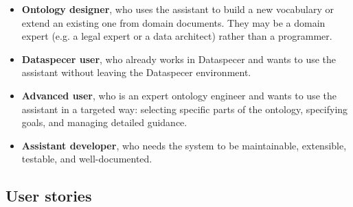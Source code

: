 \documentclass{article}
\begin{document}
\begin{itemize}
  \item \textbf{Ontology designer}, who uses the assistant to build a new vocabulary or extend an existing one from domain documents. They may be a domain expert (e.g. a legal expert or a data architect) rather than a programmer.
  \item \textbf{Dataspecer user}, who already works in Dataspecer and wants to use the assistant without leaving the Dataspecer environment.
  \item \textbf{Advanced user}, who is an expert ontology engineer and wants to use the assistant in a targeted way: selecting specific parts of the ontology, specifying goals, and managing detailed guidance.
  \item \textbf{Assistant developer}, who needs the system to be maintainable, extensible, testable, and well-documented.
\end{itemize}

\subsection{User stories}
\label{sec:user-stories}
\end{document}
